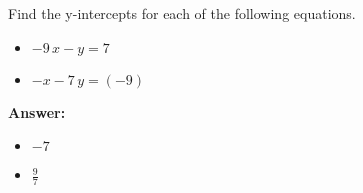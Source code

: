  Find the y-intercepts for each of the following equations. \begin{itemize}\item \( -9 \, x - y = 7 \)\item \( -x - 7 \, y = \left(-9\right) \)\end{itemize}

        \textbf{Answer:} \begin{itemize}\item \( -7 \)\item \( \frac{9}{7} \)\end{itemize}
